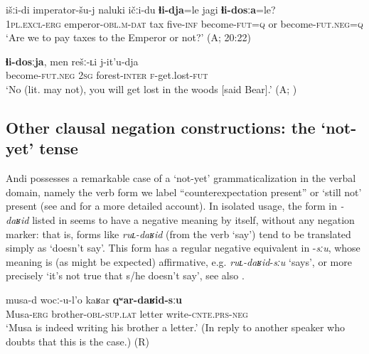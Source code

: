 \documentclass[output=paper,colorlinks=true, citecolor=brown]{langscibook}
\begin{document}
\ea
    \label{ex:and:38} 
    \gll išːi{}-di imperator{}-šu{}-j naluki ičːi{}-du \textbf{ɬi{}-dja}=le jagi \textbf{ɬi{}-dosːa}=le? \\
          \textsc{1pl.excl-erg} emperor-\textsc{obl.m}{}-\textsc{dat} tax five-\textsc{inf} become-\textsc{fut=q} or become-\textsc{fut.neg=q} \\
    \glt ‘Are we to pay taxes to the Emperor or not?’ (A;  20:22)
\z 

\ea\label{ex:and:39}
    \begin{xlist}
    \label{ex:and:39A}
    \label{ex:and:39B}
        \gll  \textbf{ɬi{}-dosːja}, men rešː{}-ʟi j{}-it’u{}-dja\\ 
               become-\textsc{fut.neg} \textsc{2sg} forest-\textsc{inter} \textsc{f-}get.lost-\textsc{fut}\\
        \glt ‘No (lit. may not), you will get lost in the woods [said Bear].’ (A; ) 
    \end{xlist}
\z 

\subsection{Other clausal negation constructions: the ‘not-yet’ tense} \label{sec:and:2.6}

Andi possesses a remarkable case of a ‘not{}-yet’ grammaticalization in the verbal domain, namely the verb form we label “counterexpectation present” or ‘still not' present (see \citealt{Maisak2018} and \citealt{MaisakVerhees2024} for a more detailed account). In isolated usage, the form in \textit{\nobreakdash-daʁid} listed in  seems to have a negative meaning by itself, without any negation marker: that is, forms like \textit{ruʟ-daʁid} (from the verb ‘say’) tend to be translated simply as ‘doesn’t say’. This form has a regular negative equivalent in {}-\textit{sːu}, whose meaning is (as might be expected) affirmative, e.g. \textit{ruʟ-daʁid}{}-\textit{sːu} ‘says’, or more precisely ‘it’s not true that s/he doesn’t say’, see also .

\ea
    \label{ex:and:40} 
    \gll musa-d wocː{}-u-l’o kaʁar \textbf{qʷar-daʁid-sːu}\\
          Musa-\textsc{erg} brother-\textsc{obl}{}-\textsc{sup.lat} letter write-\textsc{cnte.prs-neg}\\
    \glt ‘Musa is indeed writing his brother a letter.’ (In reply to another speaker who doubts that this is the case.) (R) 
\z 
\end{document}
